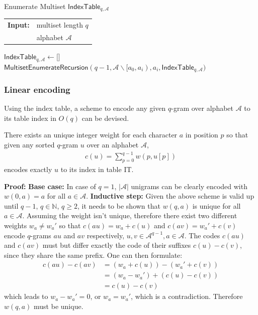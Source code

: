 \documentclass[twoside,a4paper,bsc]{master}
\newcommand{\Qgram}[1]{\(#1\)-gram}
\newcommand{\IT}[2]{\mathsf{IndexTable}_{#1,#2}}
\newcommand{\Alpha}[0]{\mathcal{A}}
\newcommand{\Nats}{\mathbb{N}}
\newcommand{\Skiptheorem}{\smallskipamount}
\newcommand{\StartFormal}[1]{\par\addvspace{\Skiptheorem}\noindent\textbf{#1}}
\newcommand{\EndFormal}{\par\addvspace{\Skiptheorem}}
\newenvironment{Proof}{\StartFormal{Proof:}}{\EndFormal}
\begin{document}
\begin{algorithm}[t]
\caption{Enumerate Multiset \(\IT{q}{\Alpha}\)}
\label{code:enumerateMultiset}
\begin{tabular}{@{}l@{~}l}
\textbf{Input:}&multiset length \(q\)\\
&alphabet \(\Alpha\)
\end{tabular}
\begin{algorithmic}
\State \(\IT{q}{\Alpha}\gets \lbrack \rbrack\)
\For{\(a_i \in \Alpha\)}
\State \(\mathsf{MultisetEnumerateRecursion}(q-1,\Alpha \backslash
[a_0,a_i),a_i,\IT{q}{\Alpha})\)
\EndFor
\end{algorithmic}
\end{algorithm}
\subsubsection{Linear encoding}
Using the index table, a scheme to encode any given \Qgram{q} over
alphabet \(\Alpha\) to its table index in \(O(q)\) can be devised.
\begin{Lemma}
\label{linearEncodingProof}
There exists an unique integer weight for each character \(a\) in position
\(p\) so that given any sorted \Qgram{q} \(u\) over an alphabet
\(\Alpha\),
\begin{align}
c(u)=\sum_{p=0}^{q-1} w(p,u[p])\label{Equation:linearenc}
\end{align}
encodes exactly \(u\) to its index in table IT.
\begin{Proof}
\textbf{Base case:} In case of \(q=1\), \(|\Alpha|\) unigrams can be
clearly encoded with \(w(0,a) = a\) for all \(a \in \Alpha\).
\textbf{Inductive step:} Given the above scheme is valid up until
\(q-1\), \(q\in \Nats\), \(q\geq 2\), it needs to be shown that
\(w(q,a)\) is unique for
all \(a\in \Alpha\). Assuming the weight isn't unique, therefore there
exist two different weights \(w_a\neq w_a'\) so that \(c(au) = w_a + c(u)\)
and \(c(av) = w_a' + c(v)\) encode \Qgram{q}s \(au\) and \(av\)
respectively, \(u,v\in \Alpha^{q-1},a\in\Alpha\). The codes \(c(au)\) and
\(c(av)\) must but differ exactly the code of their suffixes \(c(u)-c(v)\),
since they share the same prefix. One can then formulate:
\begin{align}
c(au) - c(av) &= (w_a + c(u)) - (w_a' + c(v))\\
&= (w_a - w_a') + (c(u) - c(v))\\
&= c(u) - c(v)
\end{align}
which leads to \(w_a - w_a' = 0\), or \(w_a = w_a'\), which is a
contradiction. Therefore \(w(q,a)\) must be unique.
\end{Proof}
\end{Lemma}
\end{document}
